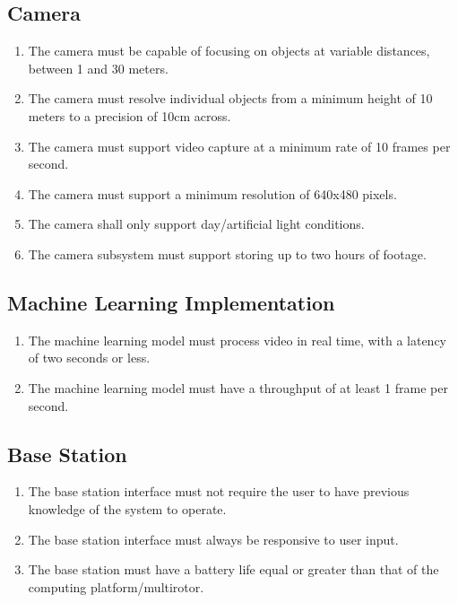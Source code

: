 \documentclass[10pt,letterpaper]{article}
\begin{document}
\subsection{Camera}
\begin{enumerate}[label=NF.CAM.\arabic*, wide=1cm, widest=3cm, leftmargin=*, font=\bfseries, noitemsep,topsep=0pt, parsep=4pt, partopsep=0pt]
	\item The camera must be capable of focusing on objects at variable distances, between 1 and 30 meters.
	\item The camera must resolve individual objects from a minimum height of 10 meters to a precision of 10cm across.
	\item The camera must support video capture at a minimum rate of 10 frames per second.
	\item The camera must support a minimum resolution of 640x480 pixels.
	\item The camera shall only support day/artificial light conditions.
	\item The camera subsystem must support storing up to two hours of footage.
\end{enumerate}

\subsection{Machine Learning Implementation}
\begin{enumerate}[label=NF.ML.\arabic*, wide=1cm, widest=3cm, leftmargin=*, font=\bfseries, noitemsep,topsep=0pt, parsep=4pt, partopsep=0pt]
	\item The machine learning model must process video in real time, with a latency of two seconds or less.
	\item The machine learning model must have a throughput of at least 1 frame per second.
\end{enumerate}

\subsection{Base Station}
\begin{enumerate}[label=NF.BS.\arabic*, wide=1cm, widest=3cm, leftmargin=*, font=\bfseries, noitemsep,topsep=0pt, parsep=4pt, partopsep=0pt]
	\item The base station interface must not require the user to have previous knowledge of the system to operate.
	\item The base station interface must always be responsive to user input.
	\item The base station must have a battery life equal or greater than that of the computing platform/multirotor.
\end{enumerate}
\end{document}
